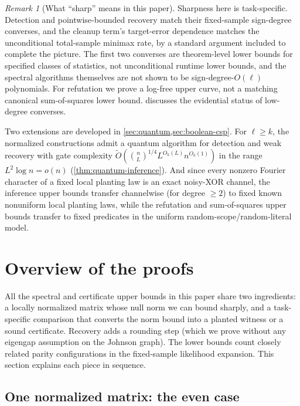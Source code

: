 \documentclass[11pt]{article}
\theoremstyle{definition}
\theoremstyle{remark}
\newtheorem{remark}[remark]{Remark}
\newcommand{\1}{\mathbf 1}
\numberwithin{equation}{section}
\begin{document}
\begin{remark}[What ``sharp'' means in this paper]\label{rem:sharp-meaning}
Sharpness here is task-specific.  Detection and pointwise-bounded
recovery match their fixed-sample sign-degree converses, and the
cleanup term's target-error dependence matches the unconditional
total-sample minimax rate, by a standard argument
included to complete the picture.  The first two converses are
theorem-level lower bounds for specified classes of statistics, not
unconditional runtime lower bounds, and the spectral algorithms
themselves are not shown to be sign-degree-$O(\ell)$ polynomials.  For
refutation we prove a log-free upper curve, not a matching canonical
sum-of-squares lower bound.   discusses the
evidential status of low-degree converses.
\end{remark}

Two extensions are developed in
\cref{sec:quantum,sec:boolean-csp}.  For $\ell\ge k$, the normalized constructions admit a quantum
algorithm for detection and weak recovery with gate complexity
$\widetilde O(\binom{n}{L}^{1/4}L^{O_k(L)}n^{O_k(1)})$ in the range
$L^2\log n=o(n)$ (\cref{thm:quantum-inference}).  And since every
nonzero Fourier character of a fixed local planting law is an exact
noisy-XOR channel, the inference upper bounds transfer channelwise (for degree $\geq 2$) to
fixed known nonuniform local planting laws, while the refutation and
sum-of-squares upper bounds transfer to fixed predicates in the uniform
random-scope/random-literal model.

\section{Overview of the proofs}\label{sec:techniques}

All the spectral and certificate upper bounds in this paper share two
ingredients: a locally normalized matrix whose null norm we can bound
sharply, and a task-specific comparison that converts the norm bound
into a planted witness or a sound certificate.  Recovery adds a
rounding step (which we prove without any eigengap assumption on the Johnson graph).  The lower
bounds count closely related parity configurations in the fixed-sample
likelihood expansion.  This section explains each piece in sequence.

\subsection{One normalized matrix: the even case}\label{sec:tech-even}
\end{document}
